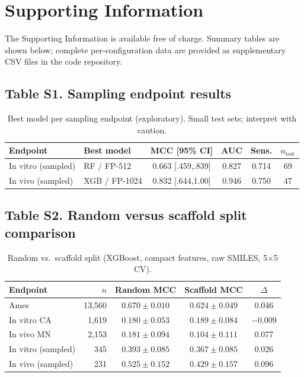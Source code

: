 \section*{Supporting Information}

The Supporting Information is available free of charge. Summary tables are shown below; complete per-configuration data are provided as supplementary CSV files in the code repository.

\subsection*{Table S1. Sampling endpoint results}

\begin{table}[ht]
\caption{Best model per sampling endpoint (exploratory). Small test sets; interpret with caution.}
\centering
\small
\begin{tabular}{@{}llcccc@{}}
\toprule
Endpoint & Best model & MCC [95\% CI] & AUC & Sens. & $n_{\text{test}}$ \\
\midrule
In vitro (sampled) & RF / FP-512 & 0.663 [.459,.839] & 0.827 & 0.714 & 69 \\
In vivo (sampled) & XGB / FP-1024 & 0.832 [.644,1.00] & 0.946 & 0.750 & 47 \\
\bottomrule
\end{tabular}
\end{table}

\subsection*{Table S2. Random versus scaffold split comparison}

\begin{table}[ht]
\caption{Random vs.\ scaffold split (XGBoost, compact features, raw SMILES, 5$\times$5 CV).}
\centering
\small
\begin{tabular}{@{}lrccc@{}}
\toprule
Endpoint & $n$ & Random MCC & Scaffold MCC & $\Delta$ \\
\midrule
Ames & 13,560 & $0.670 \pm 0.010$ & $0.624 \pm 0.049$ & 0.046 \\
In vitro CA & 1,619 & $0.180 \pm 0.053$ & $0.189 \pm 0.084$ & $-$0.009 \\
In vivo MN & 2,153 & $0.181 \pm 0.094$ & $0.104 \pm 0.111$ & 0.077 \\
In vitro (sampled) & 345 & $0.393 \pm 0.085$ & $0.367 \pm 0.085$ & 0.026 \\
In vivo (sampled) & 231 & $0.525 \pm 0.152$ & $0.429 \pm 0.157$ & 0.096 \\
\bottomrule
\end{tabular}
\end{table}

